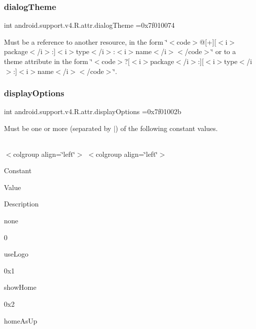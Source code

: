 \subsubsection{\texorpdfstring{dialog\+Theme}{dialogTheme}}
{\footnotesize\ttfamily int android.\+support.\+v4.\+R.\+attr.\+dialog\+Theme =0x7f010074\hspace{0.3cm}{\ttfamily [static]}}

Must be a reference to another resource, in the form \char`\"{}$<$code$>$@\mbox{[}+\mbox{]}\mbox{[}$<$i$>$package$<$/i$>$\+:\mbox{]}$<$i$>$type$<$/i$>$\+:$<$i$>$name$<$/i$>$$<$/code$>$\char`\"{} or to a theme attribute in the form \char`\"{}$<$code$>$?\mbox{[}$<$i$>$package$<$/i$>$\+:\mbox{]}\mbox{[}$<$i$>$type$<$/i$>$\+:\mbox{]}$<$i$>$name$<$/i$>$$<$/code$>$\char`\"{}. \mbox{\label{classandroid_1_1support_1_1v4_1_1R_1_1attr_abdf70ff300a74ad07128090995bf91a5}} 
\subsubsection{\texorpdfstring{display\+Options}{displayOptions}}
{\footnotesize\ttfamily int android.\+support.\+v4.\+R.\+attr.\+display\+Options =0x7f01002b\hspace{0.3cm}{\ttfamily [static]}}

Must be one or more (separated by \textquotesingle{}$\vert$\textquotesingle{}) of the following constant values.

\tabulinesep=1mm
\begin{longtabu} spread 0pt [c]{*{0}{|X[-1]}|}
\hline
\end{longtabu}
$<$colgroup align=\char`\"{}left\char`\"{}$>$ $<$colgroup align=\char`\"{}left\char`\"{}$>$ 

Constant

Value

Description 

{\ttfamily none}

0

{\ttfamily use\+Logo}

0x1

{\ttfamily show\+Home}

0x2

{\ttfamily home\+As\+Up}

